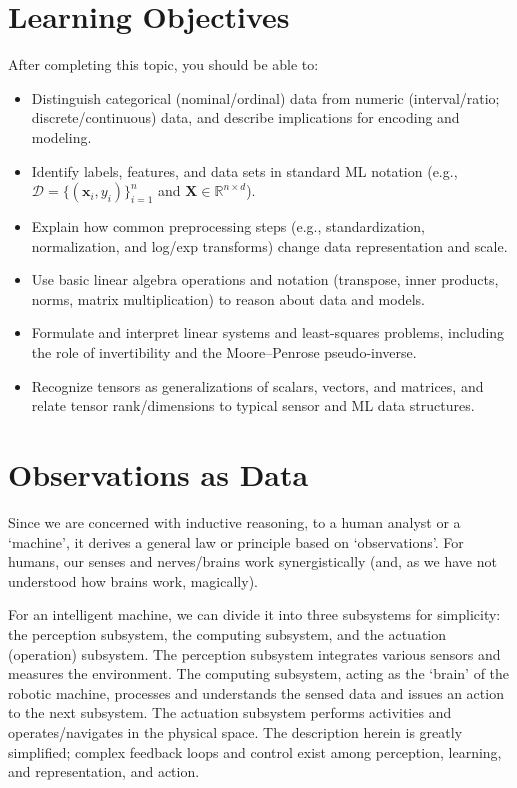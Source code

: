 \documentclass[12pt]{article}
\begin{document}
\section*{Learning Objectives}
After completing this topic, you should be able to:
\begin{itemize}
    \item Distinguish categorical (nominal/ordinal) data from numeric (interval/ratio; discrete/continuous) data, and describe implications for encoding and modeling.
    \item Identify labels, features, and data sets in standard ML notation (e.g., $\mathcal{D}=\{(\bm{x}_i,y_i)\}_{i=1}^n$ and $\bm{X}\in\mathbb{R}^{n\times d}$).
    \item Explain how common preprocessing steps (e.g., standardization, normalization, and log/exp transforms) change data representation and scale.
    \item Use basic linear algebra operations and notation (transpose, inner products, norms, matrix multiplication) to reason about data and models.
    \item Formulate and interpret linear systems and least-squares problems, including the role of invertibility and the Moore--Penrose pseudo-inverse.
    \item Recognize tensors as generalizations of scalars, vectors, and matrices, and relate tensor rank/dimensions to typical sensor and ML data structures.
\end{itemize}




\section{Observations as Data}
Since we are concerned with inductive reasoning, to a human analyst or a `machine', it derives a general law or principle based on `observations'. For humans, our senses and nerves/brains work synergistically (and, as we have not understood how brains work, magically). 

For an intelligent machine, we can divide it into three subsystems for simplicity: the perception subsystem, the computing subsystem, and the actuation (operation) subsystem. The perception subsystem integrates various sensors and measures the environment. The computing subsystem, acting as the `brain' of the robotic machine, processes and understands the sensed data and issues an action to the next subsystem. The actuation subsystem performs activities and operates/navigates in the physical space. The description herein is greatly simplified; complex feedback loops and control exist among perception, learning, and representation, and action. 
\end{document}
